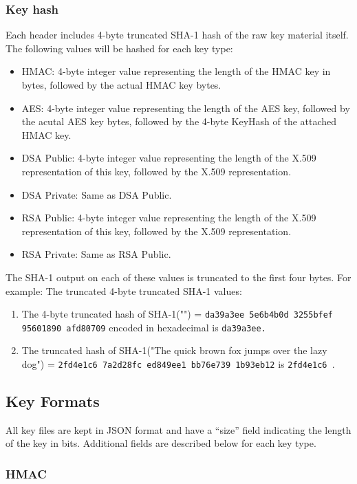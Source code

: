\documentclass{llncs}
\begin{document}
\subsubsection{Key hash}\label{keyhash}

Each header includes 4-byte truncated SHA-1 hash of the raw key
material itself. The following values will be hashed for each key type:
\begin{itemize}
  \item HMAC: 4-byte integer value representing the length of the HMAC key in
  bytes, followed by the actual HMAC key bytes.
  \item AES: 4-byte integer value representing the length of the AES key,
  followed by the acutal AES key bytes, followed by the 4-byte KeyHash of the
  attached HMAC key.
  \item DSA Public: 4-byte integer value representing the length of the X.509
  representation of this key, followed by the X.509 representation.
  \item DSA Private: Same as DSA Public.
  \item RSA Public: 4-byte integer value representing the length of the X.509
  representation of this key, followed by the X.509 representation.
  \item RSA Private: Same as RSA Public. 
\end{itemize}

The SHA-1 output on each of these values is truncated to the first four bytes.
For example: The truncated 4-byte truncated SHA-1 values:
\begin{enumerate}
  \item The 4-byte truncated hash of SHA-1("") = {\tt da39a3ee 5e6b4b0d 3255bfef
  95601890 afd80709} encoded in hexadecimal is {\tt da39a3ee.}
  \item The truncated hash of SHA-1("The quick brown fox jumps over the lazy
  dog") = {\tt 2fd4e1c6 7a2d28fc ed849ee1 bb76e739 1b93eb12} is
  {\tt 2fd4e1c6 }.
\end{enumerate}

\subsection{Key Formats}\label{formats}

All key files are kept in JSON format and have a ``size'' field indicating the
length of the key in bits. Additional fields are described below for each key
type.

\subsubsection{HMAC}
\end{document}
